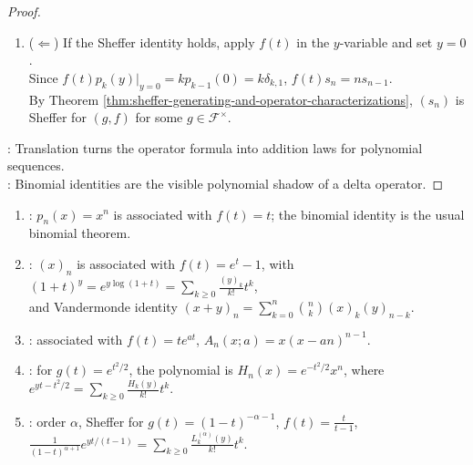 \begin{theorem}
\begin{proof}
\begin{enumerate}[label=(\roman*)]
\item[$(iii)$] ($\Leftarrow$) If the Sheffer identity holds, apply $f(t)$ in the $y$-variable and set $y=0$.\\
Since $f(t)p_k(y)|_{y=0}=k p_{k-1}(0)=k\delta_{k,1}$, $f(t)s_n=ns_{n-1}$.\\
By Theorem \ref{thm:sheffer-generating-and-operator-characterizations}, $(s_n)$ is Sheffer for $(g,f)$ for some $g\in\mathscr{F}^{\times}$.
\end{enumerate}
: Translation turns the operator formula into addition laws for polynomial sequences.\\
: Binomial identities are the visible polynomial shadow of a delta operator.
\end{proof}
\end{theorem}

\begin{example} \label{ex:sheffer-sequence-standard-examples} 
\begin{enumerate}[label=(\roman*)]
\setlength{\itemsep}{0pt}
\item {}: $p_n(x)=x^n$ is associated with $f(t)=t$; the binomial identity is the usual binomial theorem.
\item {}: $(x)_n$ is associated with $f(t)=e^t-1$, with $(1+t)^y=e^{y\log(1+t)} =\sum\limits_{k\geq0}\frac{(y)_k}{k!}t^k$,\\
and Vandermonde identity $(x+y)_n=\sum\limits_{k=0}^{n}\binom{n}{k}(x)_k(y)_{n-k}$.
\item {}: associated with $f(t)=te^{at}$, $A_n(x;a)=x(x-an)^{n-1}$.
\item {}: for $g(t)=e^{t^2/2}$, the polynomial is $H_n(x)=e^{-t^2/2}x^n$, where $e^{yt-t^2/2}=\sum\limits_{k\geq0}\frac{H_k(y)}{k!}t^k$.
\item {}: order $\alpha$, Sheffer for $g(t)=(1-t)^{-\alpha-1}$, $f(t)=\frac{t}{t-1}$, $\frac{1}{(1-t)^{\alpha+1}}e^{yt/(t-1)} =\sum\limits_{k\geq0}\frac{L_k^{(\alpha)}(y)}{k!}t^k$.
\end{enumerate}
\end{example}

